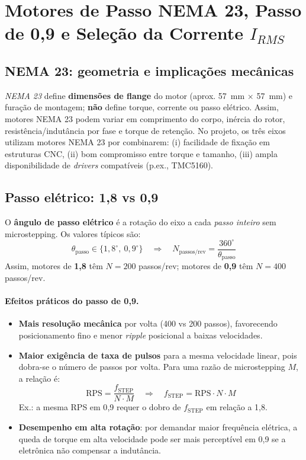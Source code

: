 \section{Motores de Passo NEMA 23, Passo de 0{,}9\textdegree{} e Seleção da Corrente \texorpdfstring{$I_{RMS}$}{IRMS}}

\subsection{NEMA 23: geometria e implicações mecânicas}
\textit{NEMA 23} define \textbf{dimensões de flange} do motor (aprox. \SI{57}{\milli\meter} $\times$ \SI{57}{\milli\meter}) e furação de montagem; \textbf{não} define torque, corrente ou passo elétrico. Assim, motores NEMA 23 podem variar em comprimento do corpo, inércia do rotor, resistência/indutância por fase e torque de retenção. No projeto, os três eixos utilizam motores NEMA 23 por combinarem:
(i) facilidade de fixação em estruturas CNC,
(ii) bom compromisso entre torque e tamanho,
(iii) ampla disponibilidade de \emph{drivers} compatíveis (p.ex., TMC5160).

\subsection{Passo elétrico: 1{,}8\textdegree{} vs 0{,}9\textdegree{}}
O \textbf{ângulo de passo elétrico} é a rotação do eixo a cada \emph{passo inteiro} sem microstepping. Os valores típicos são:
\[
\theta_{\text{passo}} \in \{1{,}8^{\circ},\ 0{,}9^{\circ}\}
\quad\Rightarrow\quad
N_{\text{passos/rev}} = \frac{360^{\circ}}{\theta_{\text{passo}}}
\]
Assim, motores de \textbf{1{,}8\textdegree{}} têm \(N=200\) passos/rev; motores de \textbf{0{,}9\textdegree{}} têm \(N=400\) passos/rev.

\paragraph{Efeitos práticos do passo de 0{,}9\textdegree{}.}
\begin{itemize}
	\item \textbf{Mais resolução mecânica} por volta (400 vs 200 passos), favorecendo posicionamento fino e menor \emph{ripple} posicional a baixas velocidades.
	\item \textbf{Maior exigência de taxa de pulsos} para a mesma velocidade linear, pois dobra-se o número de passos por volta. Para uma razão de microstepping \(M\), a relação é:
	\[
	\text{RPS} = \frac{f_{\text{STEP}}}{N \cdot M}
	\quad\Rightarrow\quad
	f_{\text{STEP}} = \text{RPS}\cdot N\cdot M
	\]
	Ex.: a mesma RPS em 0{,}9\textdegree{} requer o dobro de \(f_{\text{STEP}}\) em relação a 1{,}8\textdegree{}.
	\item \textbf{Desempenho em alta rotação}: por demandar maior frequência elétrica, a queda de torque em alta velocidade pode ser mais perceptível em 0{,}9\textdegree{} se a eletrônica não compensar a indutância.
\end{itemize}

